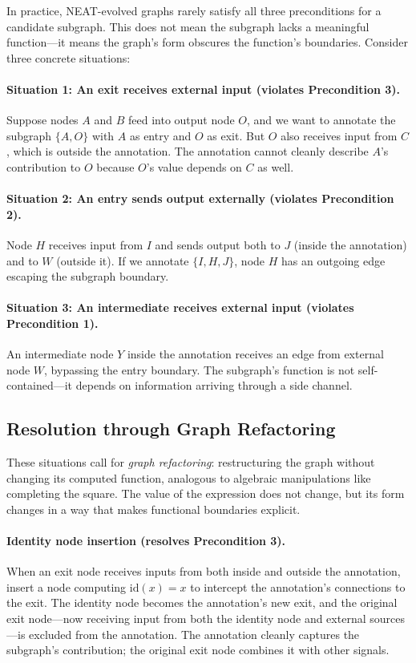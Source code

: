 \documentclass[11pt]{article}
\begin{document}
In practice, NEAT-evolved graphs rarely satisfy all three preconditions for a candidate subgraph. This does not mean the subgraph lacks a meaningful function---it means the graph's form obscures the function's boundaries. Consider three concrete situations:

\paragraph{Situation 1: An exit receives external input (violates Precondition 3).} Suppose nodes $A$ and $B$ feed into output node $O$, and we want to annotate the subgraph $\{A, O\}$ with $A$ as entry and $O$ as exit. But $O$ also receives input from $C$, which is outside the annotation. The annotation cannot cleanly describe $A$'s contribution to $O$ because $O$'s value depends on $C$ as well.

\paragraph{Situation 2: An entry sends output externally (violates Precondition 2).} Node $H$ receives input from $I$ and sends output both to $J$ (inside the annotation) and to $W$ (outside it). If we annotate $\{I, H, J\}$, node $H$ has an outgoing edge escaping the subgraph boundary.

\paragraph{Situation 3: An intermediate receives external input (violates Precondition 1).} An intermediate node $Y$ inside the annotation receives an edge from external node $W$, bypassing the entry boundary. The subgraph's function is not self-contained---it depends on information arriving through a side channel.

\subsection{Resolution through Graph Refactoring}

These situations call for \emph{graph refactoring}: restructuring the graph without changing its computed function, analogous to algebraic manipulations like completing the square. The value of the expression does not change, but its form changes in a way that makes functional boundaries explicit.

\paragraph{Identity node insertion (resolves Precondition 3).} When an exit node receives inputs from both inside and outside the annotation, insert a node computing $\text{id}(x) = x$ to intercept the annotation's connections to the exit. The identity node becomes the annotation's new exit, and the original exit node---now receiving input from both the identity node and external sources---is excluded from the annotation. The annotation cleanly captures the subgraph's contribution; the original exit node combines it with other signals.
\end{document}
